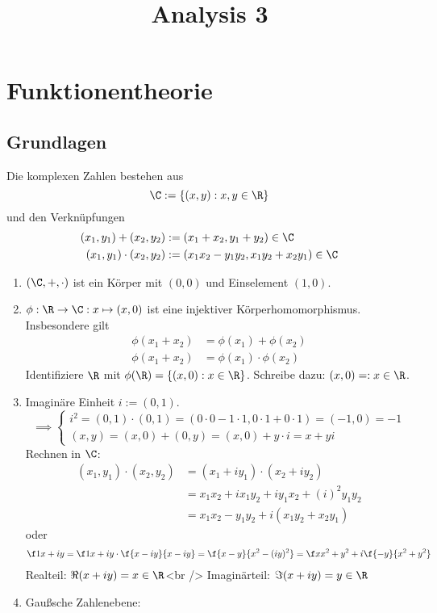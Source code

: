 \documentclass[a4paper,10pt]{scrartcl}
\title{Analysis 3}
\begin{document}
\maketitle

\tableofcontents
\newpage

\section{Funktionentheorie}

\subsection{Grundlagen}

\begin{df}
	\label{df:1.1}	
	Die komplexen Zahlen bestehen aus
	\[
		\C := \{(x,y) : x,y\in \R\}
	\]
	und den Verknüpfungen
	\begin{align*}
		(x_1,y_1) + (x_2,y_2) &:= (x_1 + x_2, y_1 + y_2) \in \C \\
		(x_1,y_1) \cdot (x_2,y_2) &:= (x_1x_2 - y_1y_2, x_1y_2 + x_2y_1) \in \C
	\end{align*}
\end{df}

\begin{note}
	\label{note:1.1}
	\begin{enumerate}
		\item $(\C,+,\cdot)$ ist ein Körper mit $(0,0)$ und Einselement $(1,0)$.
		\item 
			$\phi: \R\to \C : x\mapsto (x,0)$ ist eine injektiver Körperhomomorphismus.
			Insbesondere gilt
			\begin{align*}
				\phi(x_1+x_2) &= \phi(x_1) + \phi(x_2)\\
				\phi(x_1+x_2) &= \phi(x_1) \cdot \phi(x_2)
			\end{align*}
			Identifiziere $\R$ mit $\phi(\R) = \{(x,0) : x\in \R\}$.
			Schreibe dazu: $(x,0) =: x \in \R$.
		\item
			Imaginäre Einheit $i:= (0,1)$.
			\[
				\implies \begin{cases}
				i^2 = (0,1)\cdot (0,1) = (0\cdot 0 - 1\cdot 1, 0\cdot 1 + 0\cdot 1) = (-1,0) = -1 \\
				(x,y) = (x,0) + (0,y) = (x,0) + y\cdot i = x + yi
				\end{cases}
			\]
			Rechnen in $\C$:
			\begin{align*}
				(x_1,y_1)\cdot (x_2,y_2) &= (x_1 +iy_1)\cdot (x_2 + iy_2)\\
				&= x_1x_2 + ix_1y_2 + iy_1x_2 + (i)^2y_1y_2\\
				&= x_1x_2 - y_1y_2 + i(x_1y_2 + x_2y_1)
			\end{align*}
			oder
			\begin{align*}
				\f 1{x+iy} = \f 1{x+iy}\cdot \f {x-iy}{x-iy} = \f{x-y}{x^2-(iy)^2} = \f x{x^2+y^2} + i \f{-y}{x^2+y^2}
			\end{align*}
			Realteil: $\Re(x+iy) = x\in \R$<br />
			Imaginärteil: $\Im(x+iy) = y\in\R$
		\item
			Gaußsche Zahlenebene:
	\end{enumerate}
\end{note}
\end{document}
